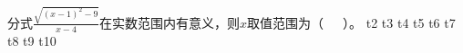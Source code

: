 \markdownRendererDocumentBegin
\markdownRendererOlBeginTight
{}分式$\frac{\sqrt{(x-1)^2-9}}{x-4}$在实数范围内有意义，则$x$取值范围为（~~~）。\markdownRendererOlItemEnd 
{}t2\markdownRendererOlItemEnd 
{}t3\markdownRendererOlItemEnd 
{}t4\markdownRendererOlItemEnd 
{}t5\markdownRendererOlItemEnd 
{}t6\markdownRendererOlItemEnd 
{}t7\markdownRendererOlItemEnd 
{}t8\markdownRendererOlItemEnd 
{}t9\markdownRendererOlItemEnd 
{}t10\markdownRendererOlItemEnd 
\markdownRendererOlEndTight \markdownRendererDocumentEnd